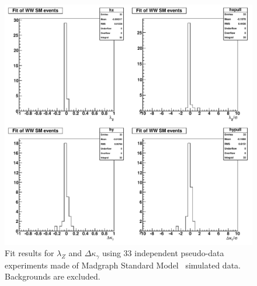 \begin{figure}[tp]
  \centerline{
    \includegraphics[width=1.0\textwidth]{figures/fit_ww_mc_1D_2}
  }

  \caption[1D fits to WW SM Monte Carlo] {Fit results for
  $\lambda_{Z}$ and $\Delta\kappa_\gamma$ using 33 independent pseudo-data
  experiments made of Madgraph Standard Model \ww\ simulated
  data. Backgrounds are excluded.}

\label{fig:fit_ww_mc_1D_2}
\end{figure}




